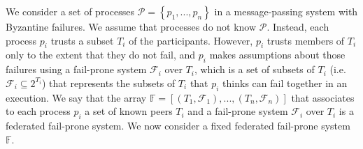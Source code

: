 \documentclass[11pt,letterpaper]{article}
\begin{document}
We consider a set of processes $\mathcal{P}=\left\{p_1,...,p_n\right\}$ in a message-passing system with Byzantine failures.
We assume that processes do not know $\mathcal{P}$.
Instead, each process $p_i$ trusts a subset $T_i$ of the participants.
However, $p_i$ trusts members of $T_i$ only to the extent that they do not fail, and $p_i$ makes assumptions about those failures using a fail-prone system $\mathcal{F}_i$ over $T_i$, which is a set of subsets of $T_i$ (i.e.\ $\mathcal{F}_i\subseteq 2^{T_i}$) that represents the subsets of $T_i$ that $p_i$ thinks can fail together in an execution.
We say that the array $\mathbb{F}=\left[\left(T_1,\mathcal{F}_1\right),...,\left(T_n,\mathcal{F}_n\right)\right]$ that associates to each process $p_i$ a set of known peers $T_i$ and a fail-prone system $\mathcal{F}_i$ over $T_i$ is a federated fail-prone system.
We now consider a fixed federated fail-prone system $\mathbb{F}$.



\end{document}
